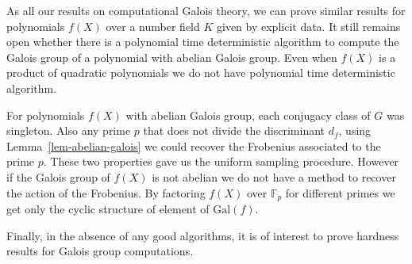\documentclass[11pt]{madras}%
\theoremstyle{remark}
\newcommand{\Gal}[1]{{\ensuremath{\mathrm{Gal}\left(#1\right)}}}
\begin{document}
As all our results on computational Galois theory, we can prove
similar results for polynomials $f(X)$ over a number field $K$ given
by explicit data.  It still remains open whether there is a polynomial
time deterministic algorithm to compute the Galois group of a
polynomial with abelian Galois group. Even when $f(X)$ is a product of
quadratic polynomials we do not have polynomial time deterministic
algorithm.

For polynomials $f(X)$ with abelian Galois group, each conjugacy class
of $G$ was singleton. Also any prime $p$ that does not divide the
discriminant $d_f$, using Lemma~\ref{lem-abelian-galois} we could
recover the Frobenius associated to the prime $p$. These two
properties gave us the uniform sampling procedure. However if the
Galois group of $f(X)$ is not abelian we do not have a method to
recover the action of the Frobenius. By factoring $f(X)$ over
$\mathbb{F}_p$ for different primes we get only the cyclic structure
of element of $\Gal{f}$.  


Finally, in the absence of any good algorithms, it is of interest to
prove hardness results for Galois group computations.

%
%
% 
%
\printindex
\end{document}
